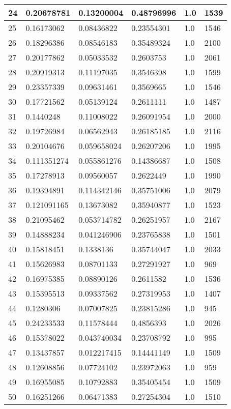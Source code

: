 \begin{longtable}{|l|l|l|l|l|l|}
24 & 0.20678781 & 0.13200004 & 0.48796996 & 1.0 & 1539 \\ \hline 
25 & 0.16173062 & 0.08436822 & 0.23554301 & 1.0 & 1546 \\ \hline 
26 & 0.18296386 & 0.08546183 & 0.35489324 & 1.0 & 2100 \\ \hline 
27 & 0.20177862 & 0.05033532 & 0.2603753 & 1.0 & 2061 \\ \hline 
28 & 0.20919313 & 0.11197035 & 0.3546398 & 1.0 & 1599 \\ \hline 
29 & 0.23357339 & 0.09631461 & 0.3569665 & 1.0 & 1546 \\ \hline 
30 & 0.17721562 & 0.05139124 & 0.2611111 & 1.0 & 1487 \\ \hline 
31 & 0.1440248 & 0.11008022 & 0.26091954 & 1.0 & 2000 \\ \hline 
32 & 0.19726984 & 0.06562943 & 0.26185185 & 1.0 & 2116 \\ \hline 
33 & 0.20104676 & 0.059658024 & 0.26207206 & 1.0 & 1995 \\ \hline 
34 & 0.111351274 & 0.055861276 & 0.14386687 & 1.0 & 1508 \\ \hline 
35 & 0.17278913 & 0.09560057 & 0.2622449 & 1.0 & 1990 \\ \hline 
36 & 0.19394891 & 0.114342146 & 0.35751006 & 1.0 & 2079 \\ \hline 
37 & 0.121091165 & 0.13673082 & 0.35940877 & 1.0 & 1523 \\ \hline 
38 & 0.21095462 & 0.053714782 & 0.26251957 & 1.0 & 2167 \\ \hline 
39 & 0.14888234 & 0.041246906 & 0.23765838 & 1.0 & 1501 \\ \hline 
40 & 0.15818451 & 0.1338136 & 0.35744047 & 1.0 & 2033 \\ \hline 
41 & 0.15626983 & 0.08701133 & 0.27291927 & 1.0 & 969 \\ \hline 
42 & 0.16975385 & 0.08890126 & 0.2611582 & 1.0 & 1536 \\ \hline 
43 & 0.15395513 & 0.09337562 & 0.27319953 & 1.0 & 1407 \\ \hline 
44 & 0.1280306 & 0.07007825 & 0.23815286 & 1.0 & 945 \\ \hline 
45 & 0.24233533 & 0.11578444 & 0.4856393 & 1.0 & 2026 \\ \hline 
46 & 0.15378022 & 0.043740034 & 0.23708792 & 1.0 & 995 \\ \hline 
47 & 0.13437857 & 0.012217415 & 0.14441149 & 1.0 & 1509 \\ \hline 
48 & 0.12608856 & 0.07724102 & 0.23972063 & 1.0 & 959 \\ \hline 
49 & 0.16955085 & 0.10792883 & 0.35405454 & 1.0 & 1509 \\ \hline 
50 & 0.16251266 & 0.06471383 & 0.27254304 & 1.0 & 1510 \\ \hline 
\end{longtable}